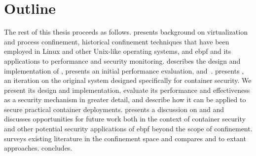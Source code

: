 \section{Outline}%
\label{s:outline}

The rest of this thesis proceeds as follows.  presents background on
virtualization and process confinement, historical confinement techniques that have been
employed in Linux and other Unix-like operating systems, and \gls{ebpf} and its applications to
performance and security monitoring.  describes the design and
implementation of \bpfbox, presents an initial performance evaluation, and~. 
presents \bpfcontain, an iteration on the original \bpfbox{} system designed
specifically for container security. We present its design and implementation, evaluate
its performance and effectiveness as a security mechanism in greater detail, and describe
how it can be applied to secure practical container deployments. 
presents a discussion on \bpfbox{} and \bpfcontain{} and discusses opportunities for
future work both in the context of container security and other potential security
applications of \gls{ebpf} beyond the scope of confinement.  surveys existing
literature in the confinement space and compares \bpfbox{} and \bpfcontain{} to extant
approaches.  concludes.
